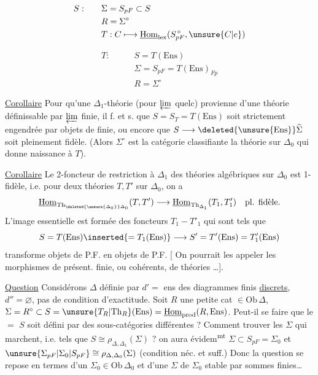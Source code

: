\[
\begin{aligned}
S:\qquad&\Sigma=S_{pF}\subset S\\
&R=\Sigma^\circ\\
&T:C\longmapsto\underline{\mathrm{Hom}}_{\mathrm{lex}}(S_{pF}^{\,\circ},\unsure{C|e})
\end{aligned}
\]

\[
\begin{aligned}
T:\qquad&S=T(\mathrm{Ens})\\
&\Sigma=S_{pF}=T(\mathrm{Ens})_{Fp}\\
&R=\Sigma^\circ
\end{aligned}
\]

\uline{Corollaire} Pour qu'une  $\Delta_1$-théorie  (pour $\varprojlim$ quelc) provienne d'une théorie définissable par $\varprojlim$ finie, il f. et s. que $S=S_T=T(\mathrm{Ens})$ soit  strictement engendrée par   objets de  finie, ou encore que $S\longrightarrow\deleted{\unsure{\mathrm{Ens}}}\widehat{\Sigma}$ soit pleinement fidèle. (Alors $\Sigma^\circ$ est la catégorie classifiante  la théorie sur $\Delta_0$ qui donne naissance à $T$).

\uline{Corollaire} Le 2-foncteur de restriction à $\Delta_1$ des théories algébriques sur $\Delta_0$ est 1-fidèle, i.e. pour  deux théories $T,T'$ sur $\Delta_0$, on a
\[
\underline{\mathrm{Hom}}_{\mathrm{Th}_{\deleted{\unsure{\Delta_0}}\Delta_0}}(T,T')\longrightarrow\underline{\mathrm{Hom}}_{\mathrm{Th}_{\Delta_1}}(T_1,T'_1)\quad\text{pl. fidèle.}
\]
L'image essentielle est formée des foncteurs $T_1-T'_1$ qui sont tels que
\[
S=T(\mathrm{Ens})\inserted{=T_1(\mathrm{Ens})}\longrightarrow S'=T'(\mathrm{Ens})=T'_1(\mathrm{Ens})
\]
transforme objets de P.F. en objets de P.F. [ On pourrait les appeler les morphismes de présent. finie, ou cohérents, de théories \ldots ].

\uline{Question} Considérons $\Delta$ définie par $d'=$ ens des diagrammes finis \uline{discrets}, $d''=\varnothing$, pas de condition d'exactitude. Soit $R$ une petite cat $\in\mathrm{Ob}\,\Delta$, $\Sigma=R^\circ\subset S=\unsure{T_R|\mathrm{Th}_R}(\mathrm{Ens})=\underline{\mathrm{Hom}}_{\mathrm{prod}}(R,\mathrm{Ens})$. Peut-il se faire que le $=$ $S$ soit défini par des sous-catégories  différentes ?  Comment trouver  les $\Sigma$ qui marchent, i.e. tels que $S\cong\rho_{\Delta,\Delta_1}(\Sigma)$ ? on aura évidem\textsuperscript{mt} $\Sigma\subset S_{pF}=\Sigma_0$ et $\unsure{\Sigma_{pF}|\Sigma_0|S_{pF}}\cong\rho_{\Delta,\Delta_0}(\Sigma)$ (condition néc. et suff.) Donc la question se repose en termes d'un $\Sigma_0\in\mathrm{Ob}\,\Delta_0$ et d'une   $\Sigma$ de $\Sigma_0$ stable par sommes finies\ldots
